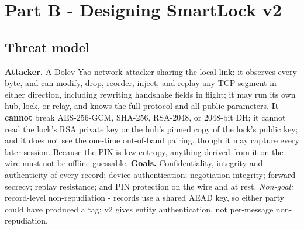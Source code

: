 \documentclass[11pt,a4paper]{article}
\begin{document}
\section{Part B - Designing SmartLock v2}

\subsection{Threat model}
\textbf{Attacker.} A Dolev-Yao network attacker sharing the local link: it observes
every byte, and can modify, drop, reorder, inject, and replay any TCP segment in
either direction, including rewriting handshake fields in flight; it may run its own
hub, lock, or relay, and knows the full protocol and all public parameters.
\textbf{It cannot} break AES-256-GCM, SHA-256, RSA-2048, or 2048-bit DH; it cannot
read the lock's RSA private key or the hub's pinned copy of the lock's public key;
and it does not see the one-time out-of-band pairing, though it may capture every
later session. Because the PIN is low-entropy, anything derived from it on the wire
must not be offline-guessable.
\textbf{Goals.} Confidentiality, integrity and authenticity of every record; device
authentication; negotiation integrity; forward secrecy; replay resistance; and PIN
protection on the wire and at rest. \emph{Non-goal:} record-level non-repudiation -
records use a shared AEAD key, so either party could have produced a tag; v2 gives
entity authentication, not per-message non-repudiation.
\end{document}
